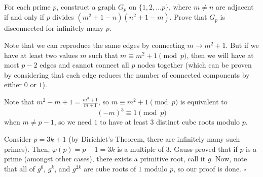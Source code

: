 
\begin{problem}[ISL 2020 N2]
    For each prime $p$, construct a graph $G_p$ on $\{1,2,\ldots p\}$, where $m\neq n$ are adjacent if and only if $p$ divides $(m^2 + 1-n)(n^2 + 1-m)$. Prove that $G_p$ is disconnected for infinitely many $p$.
\end{problem}

\begin{solution}
    Note that we can reproduce the same edges by connecting $m \rightarrow m^2+1$. But if we have at least two values $m$ such that $m \equiv m^2+1 \pmod p$, then we will have at most $p-2$ edges and cannot connect all $p$ nodes together (which can be proven by considering that each edge reduces the number of connected components by either $0$ or $1$).
    
    Note that $m^2-m+1 = \tfrac{m^3+1}{m+1}$, so $m \equiv m^2+1 \pmod p$ is equivalent to \[(-m)^3 \equiv 1 \pmod p\] when $m \neq p-1$, so we need $1$ to have at least $3$ distinct cube roots modulo $p$.
    
    Consider $p = 3k+1$ (by Dirichlet's Theorem, there are infinitely many such primes). Then, $\varphi(p) = p-1 = 3k$ is a multiple of $3$. Gauss proved that if $p$ is a prime (amongst other cases), there exists a primitive root, call it $g$. Now, note that all of $g^0$, $g^k$, and $g^{2k}$ are cube roots of $1$ modulo $p$, so our proof is done. $\square$
\end{solution}
